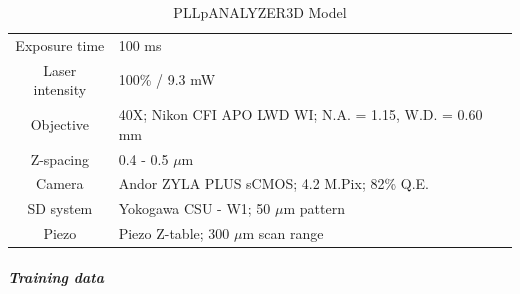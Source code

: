\documentclass[11pt,singlespacinge,twoside]{reedthesis} %
\begin{document}
\begin{longtable}[]{@{}cl@{}}
\caption{\label{tab:model3DGrT} PLLpANALYZER3D Model}\tabularnewline
\toprule
\endhead
\begin{minipage}[t]{0.23\columnwidth}\centering
Exposure time\strut
\end{minipage} & \begin{minipage}[t]{0.71\columnwidth}\raggedright
100 ms\strut
\end{minipage}\tabularnewline
\begin{minipage}[t]{0.23\columnwidth}\centering
Laser intensity\strut
\end{minipage} & \begin{minipage}[t]{0.71\columnwidth}\raggedright
100\% / 9.3 mW\strut
\end{minipage}\tabularnewline
\begin{minipage}[t]{0.23\columnwidth}\centering
Objective\strut
\end{minipage} & \begin{minipage}[t]{0.71\columnwidth}\raggedright
40X; Nikon CFI APO LWD WI; N.A. = 1.15, W.D. = 0.60 mm\strut
\end{minipage}\tabularnewline
\begin{minipage}[t]{0.23\columnwidth}\centering
Z-spacing\strut
\end{minipage} & \begin{minipage}[t]{0.71\columnwidth}\raggedright
0.4 - 0.5 \(\mu\)m\strut
\end{minipage}\tabularnewline
\begin{minipage}[t]{0.23\columnwidth}\centering
Camera\strut
\end{minipage} & \begin{minipage}[t]{0.71\columnwidth}\raggedright
Andor ZYLA PLUS sCMOS; 4.2 M.Pix; 82\% Q.E.\strut
\end{minipage}\tabularnewline
\begin{minipage}[t]{0.23\columnwidth}\centering
SD system\strut
\end{minipage} & \begin{minipage}[t]{0.71\columnwidth}\raggedright
Yokogawa CSU - W1; 50 \(\mu\)m pattern\strut
\end{minipage}\tabularnewline
\begin{minipage}[t]{0.23\columnwidth}\centering
Piezo\strut
\end{minipage} & \begin{minipage}[t]{0.71\columnwidth}\raggedright
Piezo Z-table; 300 \(\mu\)m scan range\strut
\end{minipage}\tabularnewline
\bottomrule
\end{longtable}
\hypertarget{training-data-1}{%
\subparagraph{Training data}\label{training-data-1}}
\end{document}
